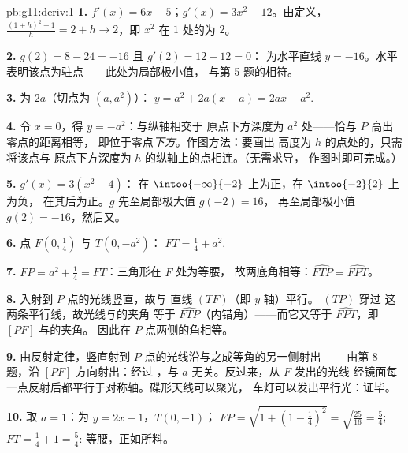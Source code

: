\begin{solution}{pb:g11:deriv:1}
\textbf{1.} $f'(x) = 6x - 5$；$g'(x) = 3x^2 - 12$。由定义，
$\frac{(1 + h)^2 - 1}{h} = 2 + h \to 2$，即
$x^2$ 在 $1$ 处的为 $2$。

\textbf{2.} $g(2) = 8 - 24 = -16$ 且 $g'(2) = 12 - 12 = 0$：
为水平直线 $y = -16$。水平
表明该点为驻点——此处为局部极小值，
与第 5 题的相符。

\textbf{3.} 为 $2a$（切点为 $(a, a^2)$）：
$y = a^2 + 2a(x - a) = 2ax - a^2$.

\textbf{4.} 令 $x = 0$，得 $y = -a^2$：与纵轴相交于
原点下方深度为 $a^2$ 处——恰与 $P$ 高出零点的距离相等，
即位于零点\emph{下方}。作图方法：要画出
高度为 $h$ 的点处的，只需将该点与
原点下方深度为 $h$ 的纵轴上的点相连。（无需求导，
作图时即可完成。）

\textbf{5.} $g'(x) = 3(x^2 - 4)$：
在 $\intoo{-\infty}{-2}$ 上为正，在 $\intoo{-2}{2}$ 上为负，
在其后为正。$g$ 先至局部极大值 $g(-2) = 16$，
再至局部极小值 $g(2) = -16$，然后又。

\textbf{6.} 点 $F\left(0, \frac14\right)$ 与 $T(0, -a^2)$：
$FT = \frac14 + a^2$.

\textbf{7.} $FP = a^2 + \frac14 = FT$：三角形在 $F$ 处为等腰，
故两底角相等：$\widehat{FTP} = \widehat{FPT}$。

\textbf{8.} 入射到 $P$ 点的光线竖直，故与
直线 $(TF)$（即 $y$ 轴）平行。 $(TP)$ 穿过
这两条平行线，故光线与的夹角
等于 $\widehat{FTP}$（内错角）——而它又等于
$\widehat{FPT}$，即 $[PF]$ 与的夹角。
因此在 $P$ 点两侧的角相等。

\textbf{9.} 由反射定律，竖直射到
$P$ 点的光线沿与之成等角的另一侧射出——
由第 8 题，沿 $[PF]$ 方向射出：经过
，与 $a$ 无关。反过来，从 $F$ 发出的光线
经镜面每一点反射后都平行于对称轴。碟形天线可以聚光，
车灯可以发出平行光：证毕。

\textbf{10.} 取 $a = 1$：为 $y = 2x - 1$，$T(0, -1)$；
$FP = \sqrt{1 + \left(1 - \frac14\right)^2} =
\sqrt{\frac{25}{16}} = \frac54$; $FT = \frac14 + 1 = \frac54$:
等腰，正如所料。


\end{solution}
